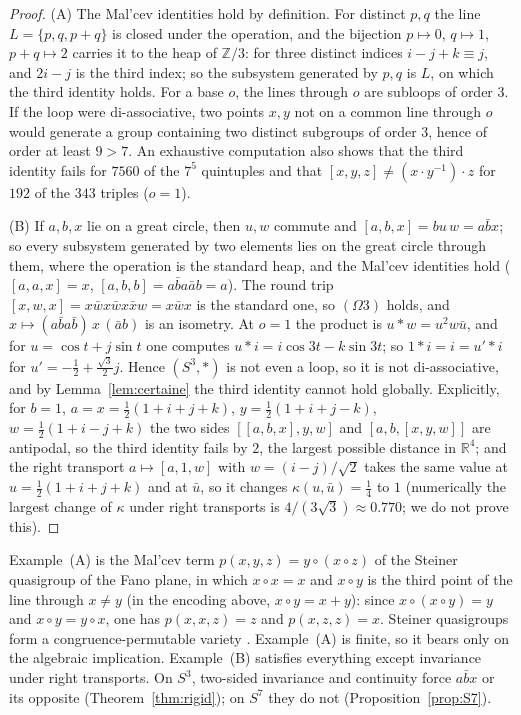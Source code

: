 \documentclass[11pt,reqno]{amsart}
\theoremstyle{definition}
\theoremstyle{remark}
\numberwithin{equation}{section}
\newcommand{\R}{\mathbb{R}}
\newcommand{\Z}{\mathbb{Z}}
\newcommand{\hp}[3]{[#1,#2,#3]}
\begin{document}
\begin{proof}
(A) The Mal'cev identities hold by definition.  For distinct $p,q$ the line $L=\{p,q,p+q\}$ is closed under the operation, and the
bijection $p\mapsto0$, $q\mapsto1$, $p+q\mapsto2$ carries it to the heap of $\Z/3$: for three distinct indices $i-j+k\equiv j$, and
$2i-j$ is the third index; so the subsystem generated by $p,q$ is $L$, on which the third identity holds.  For a base $o$, the
lines through $o$ are subloops of order $3$.  If the loop were di-associative, two points $x,y$ not on a common line through $o$
would generate a group containing two distinct subgroups of order $3$, hence of order at least $9>7$.  An exhaustive
computation also shows that the third identity fails for $7560$ of the $7^5$ quintuples and that $\hp xyz\ne(x\cdot y^{-1})\cdot z$
for $192$ of the $343$ triples ($o=1$).

(B) If $a,b,x$ lie on a great circle, then $u,w$ commute and $\hp abx=bu\,w=a\bar bx$; so every subsystem generated by two
elements lies on the great circle through them, where the operation is the standard heap, and the Mal'cev identities hold
($\hp aax=x$, $\hp abb=a\bar ba\bar a b=a$).  The round trip $\hp xwx=x\bar wx\bar w x\bar xw=x\bar wx$ is the standard one, so $(\Omega3)$
holds, and $x\mapsto(a\bar ba\bar b)\,x\,(\bar ab)$ is an isometry.  At $o=1$ the product is $u*w=u^2w\bar u$, and for
$u=\cos t+j\sin t$ one computes $u*i=i\cos3t-k\sin3t$; so $1*i=i=u'*i$ for $u'=-\tfrac12+\tfrac{\sqrt3}2j$.  Hence $(S^3,*)$ is not even a
loop, so it is not di-associative, and by Lemma~\ref{lem:certaine} the third identity cannot hold globally.  Explicitly, for
$b=1$, $a=x=\tfrac12(1+i+j+k)$, $y=\tfrac12(1+i+j-k)$, $w=\tfrac12(1+i-j+k)$ the two sides $\hp{\hp abx}yw$ and $\hp ab{\hp xyw}$ are
antipodal, so the third identity fails by $2$, the largest possible distance in $\R^4$; and the right transport $a\mapsto\hp a1w$ with
$w=(i-j)/\sqrt2$ takes the same value at $u=\tfrac12(1+i+j+k)$ and at $\bar u$, so it changes $\kappa(u,\bar u)=\tfrac14$ to $1$ (numerically the largest
change of $\kappa$ under right transports is $4/(3\sqrt3)\approx0.770$; we do not prove this).
\end{proof}

Example~(A) is the Mal'cev term $p(x,y,z)=y\circ(x\circ z)$ of the Steiner quasigroup of the Fano plane, in which $x\circ x=x$
and $x\circ y$ is the third point of the line through $x\ne y$ (in the encoding above, $x\circ y=x+y$): since $x\circ(x\circ y)=y$ and
$x\circ y=y\circ x$, one has $p(x,x,z)=z$ and $p(x,z,z)=x$.  Steiner quasigroups form a congruence-permutable variety
\cite{Quackenbush76}.  Example~(A) is finite, so it bears only on the algebraic implication.  Example~(B) satisfies everything
except invariance under right transports.  On $S^3$, two-sided invariance and continuity force $a\bar bx$ or its opposite
(Theorem~\ref{thm:rigid}); on $S^7$ they do not (Proposition~\ref{prop:S7}).
\end{document}
